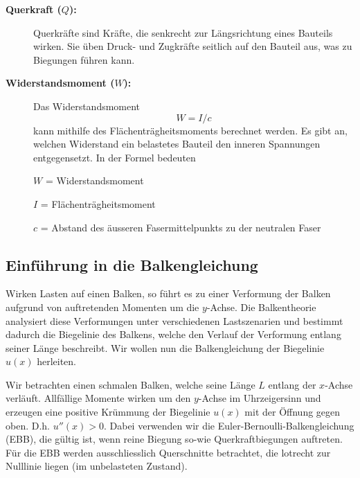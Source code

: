 \begin{description}
\item[\textbf{Querkraft ($Q$):}] Querkräfte sind Kräfte, die senkrecht zur Längsrichtung eines Bauteils wirken.
Sie üben Druck- und Zugkräfte seitlich auf den Bauteil aus, was zu Biegungen führen kann.

\item[\textbf{Widerstandsmoment ($W$):}] Das Widerstandsmoment
\begin{equation}
W=I/c
\end{equation}
kann mithilfe des Flächenträgheitsmoments berechnet werden.
Es gibt an, welchen Widerstand ein belastetes Bauteil den inneren Spannungen entgegensetzt. In der Formel bedeuten

$W$ = Widerstandsmoment

$I$ = Flächenträgheitsmoment

$c$ = Abstand des äusseren Fasermittelpunkts zu der neutralen Faser
\end{description}

\subsection{Einführung in die Balkengleichung}
Wirken Lasten auf einen Balken, so führt es zu einer Verformung der Balken aufgrund von auftretenden Momenten um die $y$-Achse.
Die Balkentheorie analysiert diese Verformungen unter verschiedenen Lastszenarien und bestimmt dadurch die Biegelinie des Balkens, welche den Verlauf der Verformung entlang seiner Länge beschreibt.
Wir wollen nun die Balkengleichung der Biegelinie $u(x)$ herleiten. \cite{balken:Balkentheorie}

Wir betrachten einen schmalen Balken, welche seine Länge $L$ entlang der $x$-Achse verläuft.
Allfällige Momente wirken um den $y$-Achse im Uhrzeigersinn und erzeugen eine positive Krümmung der Biegelinie $u(x)$ mit der Öffnung gegen oben.
D.h. $u''(x) > 0$.
Dabei verwenden wir die Euler-Bernoulli-Balkengleichung (EBB), die gültig ist, wenn reine Biegung so-wie Querkraftbiegungen auftreten.
Für die EBB werden ausschliesslich Querschnitte betrachtet, die lotrecht zur Nulllinie liegen (im unbelasteten Zustand). \cite{balken:Biegelinie}